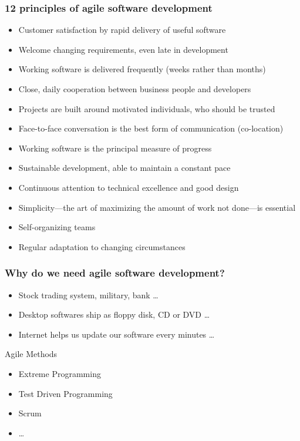 \documentclass[UTF8]{beamer}
\begin{document}
\begin{frame}
  \frametitle{12 principles of agile software development}
  \tiny
  \begin{itemize}
    \item Customer satisfaction by rapid delivery of useful software
    \item Welcome changing requirements, even late in development
    \item Working software is delivered frequently (weeks rather than months)
    \item Close, daily cooperation between business people and developers
    \item Projects are built around motivated individuals, who should be trusted
    \item Face-to-face conversation is the best form of communication (co-location)
    \item Working software is the principal measure of progress
    \item Sustainable development, able to maintain a constant pace
    \item Continuous attention to technical excellence and good design
    \item Simplicity—the art of maximizing the amount of work not done—is essential
    \item Self-organizing teams
    \item Regular adaptation to changing circumstances
  \end{itemize}
\end{frame}

\begin{frame}
  \frametitle{Why do we need agile software development?}
  \begin{itemize}
    \item Stock trading system, military, bank \ldots
    \item Desktop softwares ship as floppy disk, CD or DVD \ldots
    \item Internet helps us update our software every minutes \ldots
  \end{itemize}
\end{frame}

\begin{frame}
  \begin{block}{Agile Methods}
    \begin{itemize}
      \item Extreme Programming
      \item Test Driven Programming
      \item Scrum
      \item \ldots
    \end{itemize}
  \end{block}
\end{frame}
\end{document}
